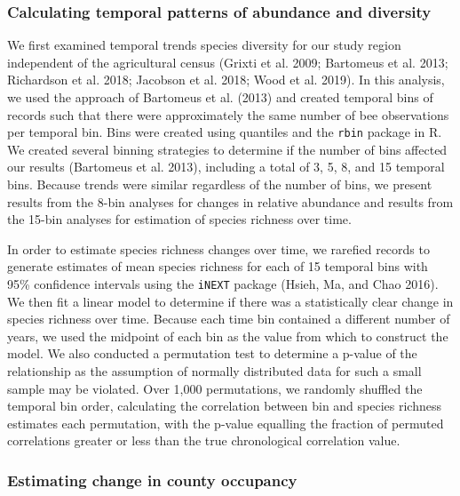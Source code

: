 \documentclass[11pt,]{article}
\begin{document}
\hypertarget{calculating-temporal-patterns-of-abundance-and-diversity}{%
\subsubsection{Calculating temporal patterns of abundance and
diversity}\label{calculating-temporal-patterns-of-abundance-and-diversity}}

We first examined temporal trends species diversity for our study region
independent of the agricultural census (Grixti et al. 2009; Bartomeus et
al. 2013; Richardson et al. 2018; Jacobson et al. 2018; Wood et al.
2019). In this analysis, we used the approach of Bartomeus et al. (2013)
and created temporal bins of records such that there were approximately
the same number of bee observations per temporal bin. Bins were created
using quantiles and the \texttt{rbin} package in R. We created several
binning strategies to determine if the number of bins affected our
results (Bartomeus et al. 2013), including a total of 3, 5, 8, and 15
temporal bins. Because trends were similar regardless of the number of
bins, we present results from the 8-bin analyses for changes in relative
abundance and results from the 15-bin analyses for estimation of species
richness over time.

In order to estimate species richness changes over time, we rarefied
records to generate estimates of mean species richness for each of 15
temporal bins with 95\% confidence intervals using the \texttt{iNEXT}
package (Hsieh, Ma, and Chao 2016). We then fit a linear model to
determine if there was a statistically clear change in species richness
over time. Because each time bin contained a different number of years,
we used the midpoint of each bin as the value from which to construct
the model. We also conducted a permutation test to determine a p-value
of the relationship as the assumption of normally distributed data for
such a small sample may be violated. Over 1,000 permutations, we
randomly shuffled the temporal bin order, calculating the correlation
between bin and species richness estimates each permutation, with the
p-value equalling the fraction of permuted correlations greater or less
than the true chronological correlation value.

\hypertarget{estimating-change-in-county-occupancy}{%
\subsubsection{Estimating change in county
occupancy}\label{estimating-change-in-county-occupancy}}
\end{document}
